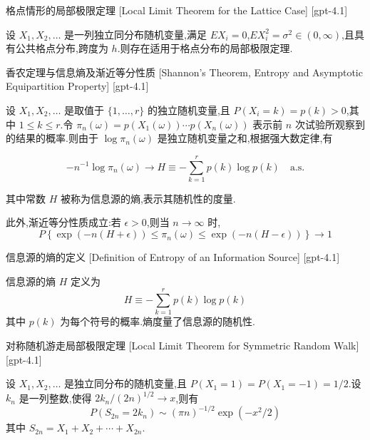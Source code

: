 \documentclass[UTF8]{ctexart}
\begin{document}
    
    
    \begin{thm}
        {格点情形的局部极限定理}
        [Local Limit Theorem for the Lattice Case]
        [gpt-4.1]
        
设 $X_1, X_2, \dots$ 是一列独立同分布随机变量,满足 $E X_i = 0$,$E X_i^2 = \sigma^2 \in (0, \infty)$,且具有公共格点分布,跨度为 $h$.则存在适用于格点分布的局部极限定理.

    \end{thm}
    
    
    
    \begin{thm}
        {香农定理与信息熵及渐近等分性质}
        [Shannon's Theorem, Entropy and Asymptotic Equipartition Property]
        [gpt-4.1]
        
设 $X_1, X_2, \dotsc$ 是取值于 $\{1, \dotsc, r\}$ 的独立随机变量,且 $P(X_i = k) = p(k) > 0$,其中 $1 \leq k \leq r$.令 $\pi_n(\omega) = p(X_1(\omega)) \cdots p(X_n(\omega))$ 表示前 $n$ 次试验所观察到的结果的概率.则由于 $\log \pi_n(\omega)$ 是独立随机变量之和,根据强大数定律,有

\[
- n^{-1} \log \pi_n(\omega) \to H \equiv - \sum_{k=1}^r p(k) \log p(k) \quad \mathrm{a.s.}
\]

其中常数 $H$ 被称为信息源的熵,表示其随机性的度量.

此外,渐近等分性质成立:若 $\epsilon > 0$,则当 $n \to \infty$ 时,
\[
P\left\{ \exp(-n(H+\epsilon)) \leq \pi_n(\omega) \leq \exp(-n(H-\epsilon)) \right\} \to 1
\]

    \end{thm}
    
    
    
    \begin{dfn}
        {信息源的熵的定义}
        [Definition of Entropy of an Information Source]
        [gpt-4.1]
        
信息源的熵 $H$ 定义为
\[
H \equiv - \sum_{k=1}^r p(k) \log p(k)
\]
其中 $p(k)$ 为每个符号的概率.熵度量了信息源的随机性.

    \end{dfn}
    
    
    
    \begin{thm}
        {对称随机游走局部极限定理}
        [Local Limit Theorem for Symmetric Random Walk]
        [gpt-4.1]
        
设 $X_1, X_2, \dots$ 是独立同分布的随机变量,且 $P(X_1 = 1) = P(X_1 = -1) = 1/2$.设 $k_n$ 是一列整数,使得 $2 k_n / (2n)^{1/2} \to x$,则有
\[
P(S_{2n} = 2 k_n) \sim (\pi n)^{-1/2} \exp(- x^2 / 2)
\]
其中 $S_{2n} = X_1 + X_2 + \cdots + X_{2n}$.

    \end{thm}
    
\end{document}
